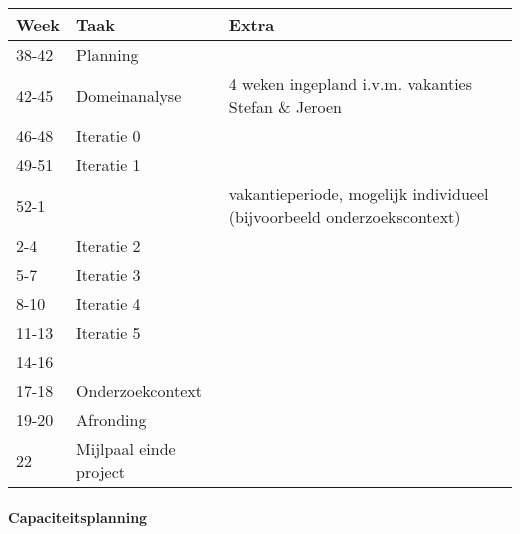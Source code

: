 \begin{tabular}{llp{7cm}}\hline
{\bf Week}    & {\bf Taak}  & {\bf Extra}\\\hline
38-42         & Planning    \\
42-45         & Domeinanalyse & 4 weken ingepland i.v.m. vakanties Stefan \& Jeroen \\
46-48         & Iteratie 0    \\
49-51         & Iteratie 1    \\
52-1          &               & vakantieperiode, mogelijk
				individueel (bijvoorbeeld onderzoekscontext) \\
2-4           & Iteratie 2    \\
5-7           & Iteratie 3    \\
8-10          & Iteratie 4    \\
11-13         & Iteratie 5    \\
14-16         &               \\
17-18         & Onderzoekcontext \\
19-20         & Afronding     \\
22            & Mijlpaal einde project

\end{tabular}

\pagebreak

\paragraph{Capaciteitsplanning}

